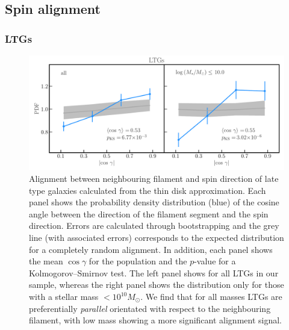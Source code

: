 
\subsection{Spin alignment}
\subsubsection{LTGs}
\begin{figure}
    \centering
    \includegraphics[width=\linewidth]{thesis/latex/halo_assembly_manga/spin_fil_LTGs_2in1.pdf}
    \caption{Alignment between neighbouring filament and spin direction of late type galaxies calculated from the thin disk approximation. Each panel shows the probability density distribution (blue) of the cosine angle between the direction of the filament segment and the spin direction. Errors are calculated through bootstrapping and the grey line (with associated errors) corresponds to the expected distribution for a completely random alignment. In addition, each panel shows the mean $\cos \gamma$ for the population and the $p$-value for a Kolmogorov--Smirnov test. The left panel shows for all LTGs in our sample, whereas the right panel shows the distribution only for those with a stellar mass $< 10^{10} M_{\odot}$. We find that for all masses LTGs are preferentially \textit{parallel} orientated with respect to the neighbouring filament, with low mass showing a more significant alignment signal.}
    \label{fig:ltgs_spin_alignment} 
\end{figure}

